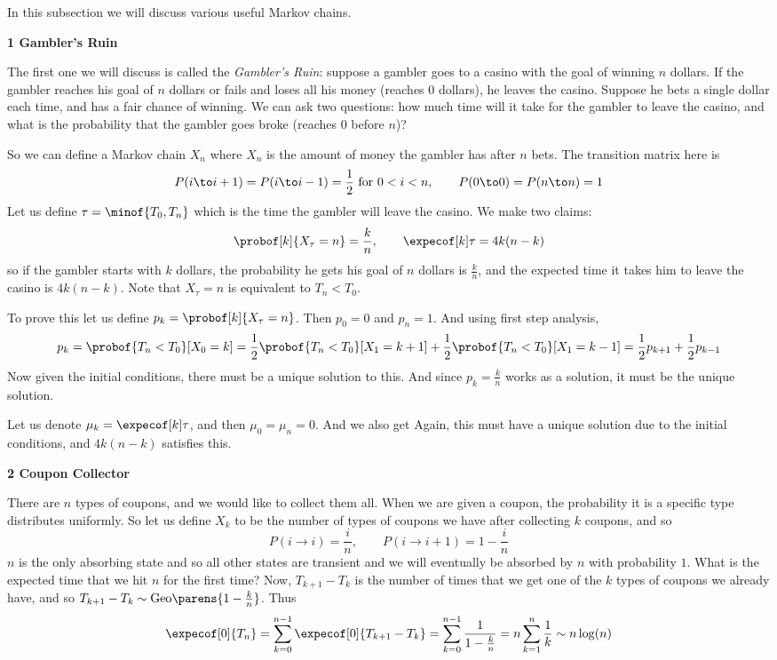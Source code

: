 In this subsection we will discuss various useful Markov chains.

\smallskip
{\bf 1 Gambler's Ruin}

The first one we will discuss is called the {\it Gambler's Ruin}: suppose a gambler goes to a casino with the goal of winning $n$ dollars.
If the gambler reaches his goal of $n$ dollars or fails and loses all his money (reaches $0$ dollars), he leaves the casino.
Suppose he bets a single dollar each time, and has a fair chance of winning.
We can ask two questions: how much time will it take for the gambler to leave the casino, and what is the probability that the gambler goes broke (reaches $0$ before $n$)?

So we can define a Markov chain $X_n$ where $X_n$ is the amount of money the gambler has after $n$ bets.
The transition matrix here is
$$ P(i\to i+1) = P(i\to i-1) = \frac12 \hbox{ for $0<i<n$},\qquad P(0\to0) = P(n\to n) = 1 $$
Let us define $\tau=\minof{T_0,T_n}$ which is the time the gambler will leave the casino.
We make two claims:
$$ \probof[k]{X_\tau=n} = \frac kn,\qquad \expecof[k]\tau = 4k(n-k) $$
so if the gambler starts with $k$ dollars, the probability he gets his goal of $n$ dollars is $\frac kn$, and the expected time it takes him to leave the casino is $4k(n-k)$.
Note that $X_\tau=n$ is equivalent to $T_n<T_0$.

To prove this let us define $p_k=\probof[k]{X_\tau=n}$.
Then $p_0=0$ and $p_n=1$.
And using first step analysis,
$$ p_k = \probof{T_n<T_0}[X_0=k] = \frac12\probof{T_n<T_0}[X_1=k+1] + \frac12\probof{T_n<T_0}[X_1=k-1] = \frac12p_{k+1} + \frac12p_{k-1} $$
Now given the initial conditions, there must be a unique solution to this.
And since $p_k=\frac kn$ works as a solution, it must be the unique solution.

Let us denote $\mu_k=\expecof[k]\tau$, and then $\mu_0=\mu_n=0$.
And we also get
Again, this must have a unique solution due to the initial conditions, and $4k(n-k)$ satisfies this.

\smallskip
{\bf 2 Coupon Collector}

There are $n$ types of coupons, and we would like to collect them all.
When we are given a coupon, the probability it is a specific type distributes uniformly.
So let us define $X_k$ to be the number of types of coupons we have after collecting $k$ coupons, and so
$$ P(i\to i) = \frac in,\qquad P(i\to i+1) = 1-\frac in $$
$n$ is the only absorbing state and so all other states are transient and we will eventually be absorbed by $n$ with probability $1$.
What is the expected time that we hit $n$ for the first time?
Now, $T_{k+1}-T_k$ is the number of times that we get one of the $k$ types of coupons we already have, and so $T_{k+1}-T_k\sim{\rm Geo}\parens{1-\frac kn}$.
Thus
$$ \expecof[0]{T_n} = \sum_{k=0}^{n-1}\expecof[0]{T_{k+1}-T_k} = \sum_{k=0}^{n-1}\frac1{1-\frac kn} = n\sum_{k=1}^n\frac1k \sim n\log(n) $$

